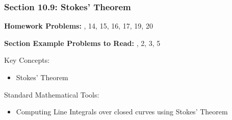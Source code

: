 %
% 

\begin{frame}
\frametitle{\Large {\color[rgb]{0.02,0.20,1.0} Section 10.9: Stokes' Theorem}}
\scriptsize

\vspace{0.2cm}
{\bf Homework Problems:} , 14, 15, 16, 17, 19, 20

\vspace{0.2cm}

{\bf Section Example Problems to Read:} , 2, 3, 5

\vspace{1.2cm}

\begin{block}{Key Concepts:}
\begin{itemize}
	\item[...] Stokes' Theorem
\end{itemize}
\end{block}

\vspace{0.6cm}

\begin{block}{Standard Mathematical Tools:}
\begin{itemize}
	\item[...] Computing Line Integrals over closed curves using Stokes' Theorem
\end{itemize}
\end{block}

\end{frame}

